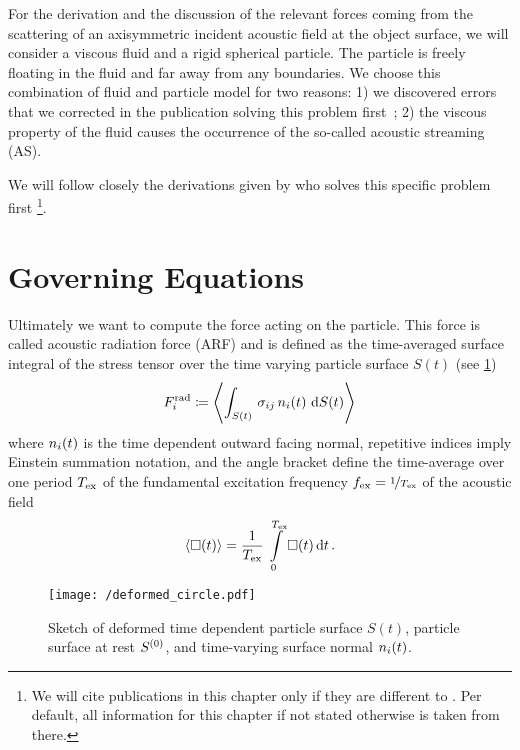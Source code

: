 For the derivation and the discussion of the relevant forces coming from the 
scattering of an axisymmetric incident acoustic field at the object surface, we 
will consider a viscous fluid and a rigid spherical particle. The particle is 
freely floating in the fluid and far away from any boundaries. We choose this 
combination of fluid and particle model for two reasons: 1) we discovered 
errors that we corrected in the publication solving this problem 
first~\cite{Doinikov1994Rigid}; 2) the viscous property of the fluid causes the 
occurrence of the so-called acoustic streaming (AS).

We will follow closely the derivations given by  who 
solves this specific problem first \footnote{We will cite publications in this 
chapter only if they are different to . Per default, 
all information for this chapter if not stated otherwise is taken from there.}.

\section{Governing Equations}

Ultimately we want to compute the force acting on the particle. This force is 
called acoustic radiation force (ARF) and is defined as the time-averaged 
surface integral of the stress tensor over the time varying particle surface 
$S(t)$ (see \cref{fig:TA-deformed_circle})
\begin{equation}
  F^{\mathrm{rad}}_{i} \coloneqq
  \left\langle \int_{S(t)}\,\sigma_{ij}\,n_{i}(t)\,\dd{S(t)} \right\rangle
  \label{eq:TA-def-rad}
\end{equation}
where $n_{i}(t)$ is the time dependent outward facing normal, repetitive 
indices imply Einstein summation notation, and the angle bracket define the 
time-average over one period $T_{\mathrm{ex}}$ of the fundamental excitation 
frequency $f_{\mathrm{ex}}=\nicefrac{1}{T_{\mathrm{ex}}}$ of the acoustic field
\begin{equation}
  \left\langle \Box(t) \right\rangle = 
  \frac{1}{T_{\mathrm{ex}}}\,\int\limits_{0}^{T_{\mathrm{ex}}}\Box(t)\dd{t}.
  \label{eq:TA-time-average}
\end{equation}

\begin{figure}[tbp]
  \centering
  \texttt{[image: /deformed\_circle.pdf]}
  \caption{Sketch of deformed time dependent particle surface $S(t)$, particle 
  surface at rest $S^{(0)}$, and time-varying surface normal $n_{i}(t)$.}
  \label{fig:TA-deformed_circle}
\end{figure}

